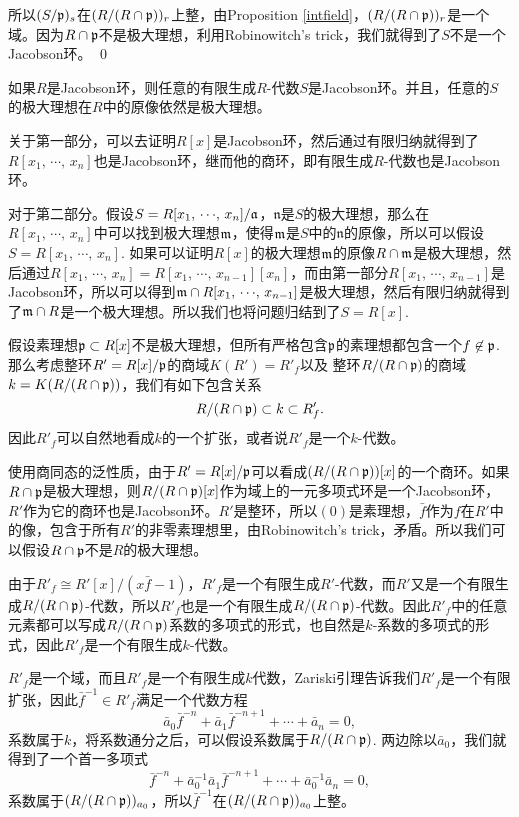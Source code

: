 	所以$(S/\mathfrak{p})_{s}$在$(R/(R\cap \mathfrak{p}))_{r}$上整，由Proposition \eqref{intfield}，$(R/(R\cap \mathfrak{p}))_{r}$是一个域。因为$R\cap \mathfrak{p}$不是极大理想，利用Robinowitch's trick，我们就得到了$S$不是一个Jacobson环。
\qed

\theo 如果$R$是Jacobson环，则任意的有限生成$R$-代数$S$是Jacobson环。并且，任意的$S$的极大理想在$R$中的原像依然是极大理想。

\proof 关于第一部分，可以去证明$R[x]$是Jacobson环，然后通过有限归纳就得到了$R[x_1,\,\cdots\!,\,x_n]$也是Jacobson环，继而他的商环，即有限生成$R$-代数也是Jacobson环。

对于第二部分。假设$S=R[x_1,\,\cdots\!,\,x_n]/\mathfrak{a}$，$\mathfrak{n}$是$S$的极大理想，那么在$R[x_1,\,\cdots\!,\,x_n]$中可以找到极大理想$\mathfrak{m}$，使得$\mathfrak{m}$是$S$中的$\mathfrak{n}$的原像，所以可以假设$S=R[x_1,\,\cdots\!,\,x_n]$. 如果可以证明$R[x]$的极大理想$\mathfrak{m}$的原像$R\cap \mathfrak{m}$是极大理想，然后通过$R[x_1,\,\cdots\!,\,x_{n}]=R[x_1,\,\cdots\!,\,x_{n-1}][x_n]$，而由第一部分$R[x_1,\,\cdots\!,\,x_{n-1}]$是Jacobson环，所以可以得到$\mathfrak{m}\cap R[x_1,\,\cdots\!,\,x_{n-1}]$是极大理想，然后有限归纳就得到了$\mathfrak{m} \cap R$是一个极大理想。所以我们也将问题归结到了$S=R[x]$.

假设素理想$\mathfrak{p}\subset R[x]$不是极大理想，但所有严格包含$\mathfrak{p}$的素理想都包含一个$f\not\in \mathfrak{p}$. 那么考虑整环$R'=R[x]/\mathfrak{p}$的商域$K(R')=R'_f$以及
整环$R/(R\cap \mathfrak{p})$的商域$k=K(R/(R\cap \mathfrak{p}))$，我们有如下包含关系
\[
	R/(R\cap \mathfrak{p})\subset k \subset R'_{f}.
\]
因此$R'_f$可以自然地看成$k$的一个扩张，或者说$R'_f$是一个$k$-代数。

使用商同态的泛性质，由于$R'=R[x]/\mathfrak{p}$可以看成$(R/(R\cap \mathfrak{p}))[x]$的一个商环。如果$R\cap \mathfrak{p}$是极大理想，则$R/(R\cap \mathfrak{p})[x]$作为域上的一元多项式环是一个Jacobson环，$R'$作为它的商环也是Jacobson环。$R'$是整环，所以$(0)$是素理想，$\bar{f}$作为$f$在$R'$中的像，包含于所有$R'$的非零素理想里，由Robinowitch's trick，矛盾。所以我们可以假设$R\cap \mathfrak{p}$不是$R$的极大理想。

由于$R'_f\cong R'[x]/(x\bar{f}-1)$，$R'_f$是一个有限生成$R'$-代数，而$R'$又是一个有限生成$R/(R\cap \mathfrak{p})$-代数，所以$R'_{f}$也是一个有限生成$R/(R\cap \mathfrak{p})$-代数。因此$R'_f$中的任意元素都可以写成$R/(R\cap \mathfrak{p})$系数的多项式的形式，也自然是$k$-系数的多项式的形式，因此$R'_f$是一个有限生成$k$-代数。

$R'_f$是一个域，而且$R'_f$是一个有限生成$k$代数，Zariski引理告诉我们$R'_f$是一个有限扩张，因此$\bar{f}^{-1}\in R'_f$满足一个代数方程
\[
	\bar{a}_0\bar{f}^{-n}+\bar{a}_{1}\bar{f}^{-n+1}+\cdots+\bar{a}_n=0,
\]
系数属于$k$，将系数通分之后，可以假设系数属于$R/(R\cap \mathfrak{p})$. 两边除以$\bar{a}_0$，我们就得到了一个首一多项式
\[
	\bar{f}^{-n}+\bar{a}_0^{-1}\bar{a}_{1}\bar{f}^{-n+1}+\cdots+\bar{a}_0^{-1}\bar{a}_n=0,
\]
系数属于$(R/(R\cap \mathfrak{p}))_{a_0}$，所以$\bar{f}^{-1}$在$(R/(R\cap \mathfrak{p}))_{a_0}$上整。

